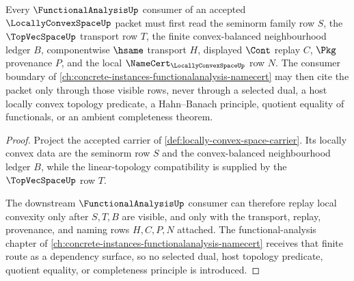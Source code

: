\begin{theorem}
\label{thm:locally-convex-space-functional-analysis-route}
Every $\FunctionalAnalysisUp$ consumer of an accepted $\LocallyConvexSpaceUp$ packet must first read the seminorm family row $S$, the $\TopVecSpaceUp$ transport row $T$, the finite convex-balanced neighbourhood ledger $B$, componentwise $\hsame$ transport $H$, displayed $\Cont$ replay $C$, $\Pkg$ provenance $P$, and the local $\NameCert_{\LocallyConvexSpaceUp}$ row $N$. The consumer boundary of \autoref{ch:concrete-instances-functionalanalysis-namecert} may then cite the packet only through those visible rows, never through a selected dual, a host locally convex topology predicate, a Hahn--Banach principle, quotient equality of functionals, or an ambient completeness theorem.
\end{theorem}
\begin{proof}
Project the accepted carrier of \autoref{def:locally-convex-space-carrier}. Its locally convex data are the seminorm row $S$ and the convex-balanced neighbourhood ledger $B$, while the linear-topology compatibility is supplied by the $\TopVecSpaceUp$ row $T$.

The downstream $\FunctionalAnalysisUp$ consumer can therefore replay local convexity only after $S,T,B$ are visible, and only with the transport, replay, provenance, and naming rows $H,C,P,N$ attached. The functional-analysis chapter of \autoref{ch:concrete-instances-functionalanalysis-namecert} receives that finite route as a dependency surface, so no selected dual, host topology predicate, quotient equality, or completeness principle is introduced.
\end{proof}
